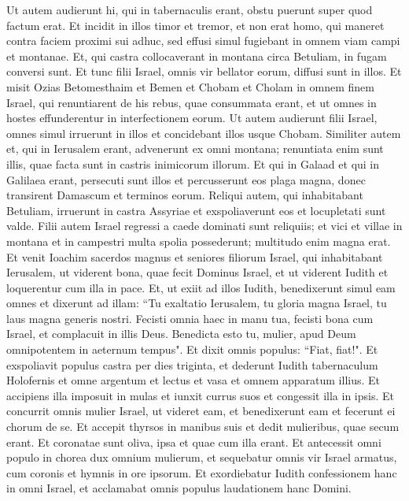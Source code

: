 \begin{biblechapter}  
\verse Ut autem audierunt hi, qui in tabernaculis erant, obstu puerunt super quod factum erat. 
\verse Et incidit in illos timor et tremor, et non erat homo, qui maneret contra faciem proximi sui adhuc, sed effusi simul fugiebant in omnem viam campi et montanae. 
\verse Et, qui castra collocaverant in montana circa Betuliam, in fugam conversi sunt. Et tunc filii Israel, omnis vir bellator eorum, diffusi sunt in illos. 
\verse Et misit Ozias Betomesthaim et Bemen et Chobam et Cholam in omnem finem Israel, qui renuntiarent de his rebus, quae consummata erant, et ut omnes in hostes effunderentur in interfectionem eorum.  
\verse Ut autem audierunt filii Israel, omnes simul irruerunt in illos et concidebant illos usque Chobam. Similiter autem et, qui in Ierusalem erant, advenerunt ex omni montana; renuntiata enim sunt illis, quae facta sunt in castris inimicorum illorum. Et qui in Galaad et qui in Galilaea erant, persecuti sunt illos et percusserunt eos plaga magna, donec transirent Damascum et terminos eorum. 
\verse Reliqui autem, qui inhabitabant Betuliam, irruerunt in castra Assyriae et exspoliaverunt eos et locupletati sunt valde. 
\verse Filii autem Israel regressi a caede dominati sunt reliquiis; et vici et villae in montana et in campestri multa spolia possederunt; multitudo enim magna erat. 
\verse Et venit Ioachim sacerdos magnus et seniores filiorum Israel, qui inhabitabant Ierusalem, ut viderent bona, quae fecit Dominus Israel, et ut viderent Iudith et loquerentur cum illa in pace. 
\verse Et, ut exiit ad illos Iudith, benedixerunt simul eam omnes et dixerunt ad illam: “Tu exaltatio Ierusalem, tu gloria magna Israel, tu laus magna generis nostri. 
\verse Fecisti omnia haec in manu tua, fecisti bona cum Israel, et complacuit in illis Deus. Benedicta esto tu, mulier, apud Deum omnipotentem in aeternum tempus". Et dixit omnis populus: “Fiat, fiat!". 
\verse Et exspoliavit populus castra per dies triginta, et dederunt Iudith tabernaculum Holofernis et omne argentum et lectus et vasa et omnem apparatum illius. Et accipiens illa imposuit in mulas et iunxit currus suos et congessit illa in ipsis. 
\verse Et concurrit omnis mulier Israel, ut videret eam, et benedixerunt eam et fecerunt ei chorum de se. Et accepit thyrsos in manibus suis et dedit mulieribus, quae secum erant. 
\verse Et coronatae sunt oliva, ipsa et quae cum illa erant. Et antecessit omni populo in chorea dux omnium mulierum, et sequebatur omnis vir Israel armatus, cum coronis et hymnis in ore ipsorum.  
\verse Et exordiebatur Iudith confessionem hanc in omni Israel, et acclamabat omnis populus laudationem hanc Domini. 
\end{biblechapter}

